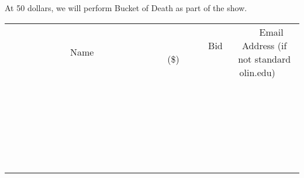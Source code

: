 \documentclass[11pt]{article}
\begin{document}
At 50 dollars, we will perform Bucket of Death as part of the show.
\\[6ex]
\begin{tabular}{c c c}
~~~~~~~~~~~~~Name~~~~~~~~~~~~~ & ~~~~~~~~~Bid (\$)~~~~~~~~~  & ~~~Email Address (if not standard olin.edu)~~~\\
 & & \\
\hline
 & & \\
\hline
 & & \\
\hline
 & & \\
\hline
 & & \\
\hline
 & & \\
\hline
 & & \\
\hline
 & & \\
\hline
 & & \\
\hline
 & & \\
\hline
 & & \\
\hline
 & & \\
\hline
 & & \\
\hline
 & & \\
\hline
 & & \\
\hline
 & & \\
\hline
 & & \\
\hline
 & & \\
\hline
 & & \\
\hline
 & & \\
\hline
 & & \\
\hline
 & & \\
\hline
 & & \\
\hline
 & & \\
\hline
 & & \\
\hline
 & & \\
\hline
\end{tabular}
\newpage
\end{document}
